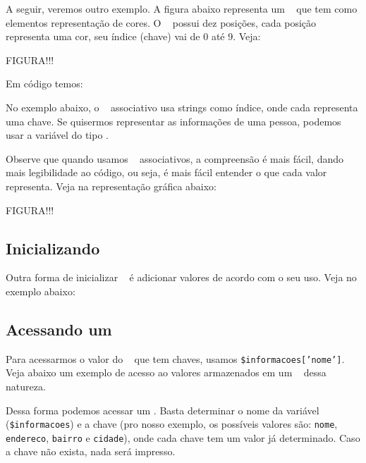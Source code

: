 A seguir, veremos outro exemplo. A figura abaixo representa um \tipoarray~ que tem 
como elementos representação de cores. O \tipoarray~ possui dez posições, 
cada posição representa uma cor, seu índice (chave) vai de 0 até 9. Veja:

FIGURA!!!

Em código temos:



No exemplo abaixo, o \tipoarray~ associativo usa strings como índice, onde cada 
\tipostring representa uma chave. Se quisermos representar as informações de uma
pessoa, podemos usar a variável do tipo \tipoarray.



Observe que quando usamos \tipoarrays~ associativos, a compreensão é mais fácil, 
dando mais legibilidade ao código, ou seja, é mais fácil entender o que cada valor
representa. Veja na representação gráfica abaixo:

FIGURA!!!

\subsection{Inicializando \tipoarrays}
\label{inicializando-arrays}

Outra forma de inicializar \tipoarrays~ é adicionar valores de acordo com o seu 
uso. Veja no exemplo abaixo:



\subsection{Acessando um \tipoarray}
\label{acessando-um-array}

Para acessarmos o valor do \tipoarray~ que tem chaves, usamos \texttt{\$informacoes['nome']}. 
Veja abaixo um exemplo de acesso ao valores armazenados em um \tipoarray~ dessa natureza.



Dessa forma podemos acessar um \tipoarray. Basta determinar o nome da variável
(\texttt{\$informacoes}) e a chave (pro nosso exemplo, os possíveis valores são:
\texttt{nome}, \texttt{endereco}, \texttt{bairro} e \texttt{cidade}), onde cada chave tem 
um valor já determinado. Caso a chave não exista, nada será impresso.

